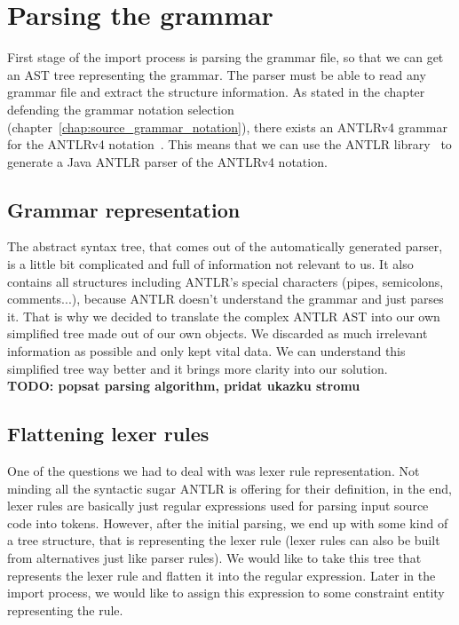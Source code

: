 \section{Parsing the grammar}
\label{chap:parsing_the_grammar}

First stage of the import process is parsing the grammar file, so that we can get an AST tree representing the grammar.
The parser must be able to read any grammar file and extract the structure information.
As stated in the chapter defending the grammar notation selection (chapter~\ref{chap:source_grammar_notation}), there exists an ANTLRv4 grammar for the ANTLRv4 notation~\cite{ANTLR4reference}.
This means that we can use the ANTLR library~\cite{ANTLR4} to generate a Java ANTLR parser of the ANTLRv4 notation.

\subsection{Grammar representation}

The abstract syntax tree, that comes out of the automatically generated parser, is a little bit complicated and full of information not relevant to us.
It also contains all structures including ANTLR's special characters (pipes, semicolons, comments...), because ANTLR doesn't understand the grammar and just parses it.
That is why we decided to translate the complex ANTLR AST into our own simplified tree made out of our own objects.
We discarded as much irrelevant information as possible and only kept vital data.
We can understand this simplified tree way better and it brings more clarity into our solution.
\\

\textbf{TODO: popsat parsing algorithm, pridat ukazku stromu}

\subsection{Flattening lexer rules}
One of the questions we had to deal with was lexer rule representation.
Not minding all the syntactic sugar ANTLR is offering for their definition, in the end, lexer rules are basically just regular expressions used for parsing input source code into tokens.
However, after the initial parsing, we end up with some kind of a tree structure, that is representing the lexer rule (lexer rules can also be built from alternatives just like parser rules).
We would like to take this tree that represents the lexer rule and flatten it into the regular expression.
Later in the import process, we would like to assign this expression to some constraint entity representing the rule.

